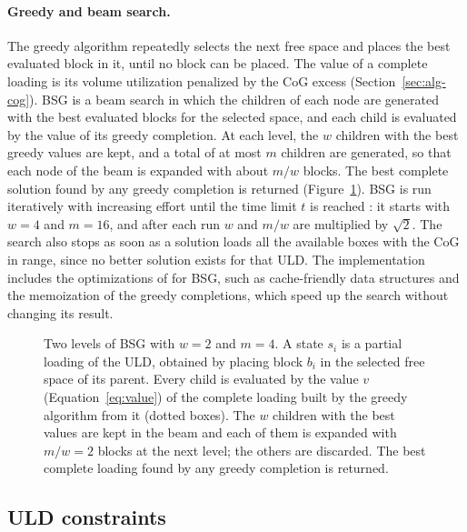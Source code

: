 \paragraph{Greedy and beam search.}
The greedy algorithm repeatedly selects the next free space and places the best evaluated block
in it, until no block can be placed. The value of a complete loading is its volume utilization
penalized by the CoG excess (Section~\ref{sec:alg-cog}). BSG \citep{Araya2014} is a beam
search in which the children of each node are generated with the best evaluated blocks for the
selected space, and each child is evaluated by the value of its greedy completion. At each
level, the $w$ children with the best greedy values are kept, and a total of at most $m$
children are generated, so that each node of the beam is expanded with about $m/w$ blocks. The
best complete solution found by any greedy completion is returned (Figure~\ref{fig:bsg}). BSG is
run iteratively with
increasing effort until the time limit $t$ is reached \citep{Araya2017}: it starts with $w = 4$
and $m = 16$, and after each run $w$ and $m/w$ are multiplied by $\sqrt{2}$. The search also stops
as soon as a solution loads all the available boxes with the CoG in range, since no better
solution exists for that ULD. The implementation includes the optimizations of
\citet{Guesser2026} for BSG, such as cache-friendly data structures and the memoization of the
greedy completions, which speed up the search without changing its result.

\begin{figure}[htbp]
\centering
\resizebox{\textwidth}{!}{}
\caption{Two levels of BSG with $w = 2$ and $m = 4$. A state $s_i$ is a partial loading of the
ULD, obtained by placing block $b_i$ in the selected free space of its parent. Every child is
evaluated by the value $v$ (Equation~\ref{eq:value}) of the complete loading built by the
greedy algorithm from it (dotted boxes). The $w$ children with the best values are kept in the
beam and each of them is expanded with $m/w = 2$ blocks at the next level; the others are
discarded. The best complete loading found by any greedy completion is returned.}
\label{fig:bsg}
\end{figure}

\subsection{ULD constraints}
\label{sec:alg-uld}

